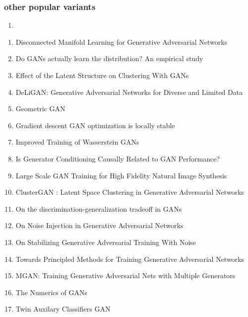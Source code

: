 \documentclass[acmlarge]{acmart}
\begin{document}
		\subsubsection{other popular variants}
		\begin{enumerate}
			\item
		\end{enumerate}
	\begin{enumerate}
		\item Disconnected Manifold Learning for Generative Adversarial Networks \cite{Khayatkhoei2018DisconnectedML} 

		\item Do GANs actually learn the distribution? An empirical study \cite{Arora2017DoGA} 

		\item Effect of the Latent Structure on Clustering With GANs \cite{Mishra2020EffectOT} 

		\item DeLiGAN: Generative Adversarial Networks for Diverse and Limited Data \cite{Gurumurthy2017DeLiGANGA} 

		\item Geometric GAN \cite{Lim2017GeometricG} 

		\item Gradient descent GAN optimization is locally stable \cite{Nagarajan2017GradientDG} 

		\item Improved Training of Wasserstein GANs \cite{Gulrajani2017ImprovedTO} 

		\item Is Generator Conditioning Causally Related to GAN Performance? \cite{Odena2018IsGC} 

		\item Large Scale GAN Training for High Fidelity Natural Image Synthesis \cite{Brock2019LargeSG} 

		\item ClusterGAN : Latent Space Clustering in Generative Adversarial Networks \cite{Mukherjee2019ClusterGANL} 

		\item On the discrimination-generalization tradeoff in GANs \cite{zhang2017discrimination} 

		\item On Noise Injection in Generative Adversarial Networks \cite{Feng2020OnNI} 

		\item On Stabilizing Generative Adversarial Training With Noise \cite{Jenni2019OnSG} 

		\item Towards Principled Methods for Training Generative Adversarial Networks \cite{Arjovsky2017TowardsPM} 

		\item MGAN: Training Generative Adversarial Nets with Multiple Generators \cite{Hoang2018MGANTG} 

		\item The Numerics of GANs \cite{Mescheder2017TheNO} 

		\item Twin Auxilary Classifiers GAN \cite{Gong2019TwinAC} 

	\end{enumerate}
\end{document}
